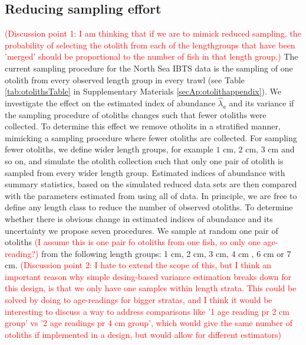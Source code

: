 \documentclass[a4paper 12pt]{article}
\numberwithin{equation}{section}
\newcommand{\ed}[1]{\textcolor{red}{#1}}
\begin{document}
{\subsection{Reducing sampling effort}
\label{sec:optimizationsampling}
\ed{(Discussion point 1: I am thinking that if we are to mimick reduced sampling, the probability of selecting the otolith from each of the lengthgroups that have been 'merged' should be proportional to the number of fish in that length group.)}
The current sampling procedure for the North Sea IBTS data is the sampling of one otolith from every observed length group in every trawl (see Table \ref{tab:otolithsTable} in Supplementary Materials \ref{secAp:otolithappendix}). We investigate the effect on the estimated index of abundance $\hat{\lambda}_{a}$ and its variance if the sampling procedure of otoliths changes such that fewer otoliths were collected. To determine this effect we remove otholits in a stratified manner, mimicking a sampling procedure where fewer otoliths are collected. For sampling fewer otoliths, we define wider length groups, for example $1$ cm, $2$ cm, $3$ cm and so on,  and simulate the otolith  collection such that only one pair of otolith is sampled from every wider length group. Estimated indices of abundance with summary statistics, based on the simulated reduced data sets are then compared with the parameters estimated from using all of data. In principle, we are free to define any length class to reduce the number of observed otoliths. To determine whether there is obvious change in estimated indices of abundance and its uncertainty we propose seven procedures. We sample at random one pair of otoliths \ed{(I assume this is one pair fo otoliths from one fish, so only one age-reading?)} from the following length groups: 1 cm, 2 cm,  3 cm, 4 cm , 6 cm or  7 cm. 
\ed{(Discussion point 2: I hate to extend the scope of this, but I think an important reason why simple desing-based variance estimation breaks down for this design, is that we only have one samples within length strata. This could be solved by doing to age-readings for bigger stratas, and I think it would be interesting to discuss a way to address comparisons like '1 age reading pr 2 cm group' vs '2 age readings pr 4 cm group', which would give the same number of otoliths if implemented in a design, but would allow for different estimators)}



}
\end{document}
